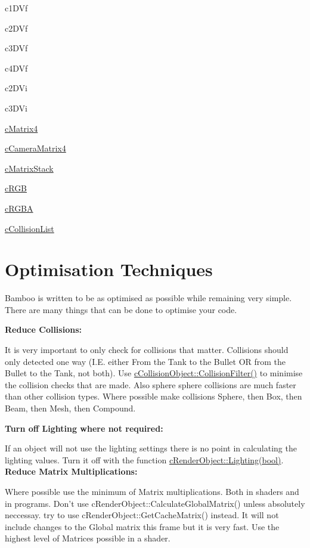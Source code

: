 \begin{DoxyItemize}
\item c1DVf
\item c2DVf
\item c3DVf
\item c4DVf
\item c2DVi
\item c3DVi
\item \hyperlink{classc_matrix4}{cMatrix4}
\item \hyperlink{classc_camera_matrix4}{cCameraMatrix4}
\item \hyperlink{classc_matrix_stack}{cMatrixStack}
\item \hyperlink{classc_r_g_b}{cRGB}
\item \hyperlink{classc_r_g_b_a}{cRGBA}
\item \hyperlink{classc_collision_list}{cCollisionList}
\end{DoxyItemize}\hypertarget{_reference_lists_OptimisationTechniques}{}\section{Optimisation Techniques}\label{_reference_lists_OptimisationTechniques}
Bamboo is written to be as optimised as possible while remaining very simple. There are many things that can be done to optimise your code. \par
 {\bfseries Reduce Collisions:} \par
 It is very important to only check for collisions that matter. Collisions should only detected one way (I.E. either From the Tank to the Bullet OR from the Bullet to the Tank, not both). Use \hyperlink{classc_collision_object_a1490cdf75c8037049bfa7891aa8756b7}{cCollisionObject::CollisionFilter()} to minimise the collision checks that are made. Also sphere sphere collisions are much faster than other collision types. Where possible make collisions Sphere, then Box, then Beam, then Mesh, then Compound. \par
 {\bfseries Turn off Lighting where not required:} \par
 If an object will not use the lighting settings there is no point in calculating the lighting values. Turn it off with the function \hyperlink{classc_render_object_a67191d0fe8aceaa10052a542b3c34650}{cRenderObject::Lighting(bool)}. {\bfseries Reduce Matrix Multiplications:} \par
 Where possible use the minimum of Matrix multiplications. Both in shaders and in programs. Don't use cRenderObject::CalculateGlobalMatrix() unless absolutely neccessay. try to use cRenderObject::GetCacheMatrix() instead. It will not include changes to the Global matrix this frame but it is very fast. Use the highest level of Matrices possible in a shader. \par
